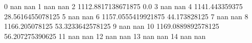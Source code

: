 0 nan nan
1 nan nan
2 1112.8817138671875 0.0
3 nan nan
4 1141.443359375 28.5616455078125
5 nan nan
6 1157.0555419921875 44.173828125
7 nan nan
8 1166.205078125 53.3233642578125
9 nan nan
10 1169.0889892578125 56.207275390625
11 nan nan
12 nan nan
13 nan nan
14 nan nan
